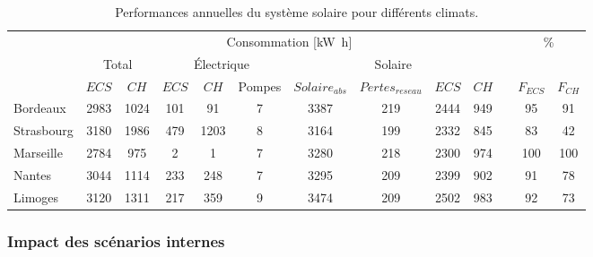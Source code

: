 \begin{table}
\small
\centering
\caption{Performances annuelles du système solaire pour différents climats.}
\label{tab:performance_annuelles}
\begin{tabular}{l c c c c c c c c c c c c}
    \toprule
               &   \multicolumn{9}{c}{Consommation [\si{\kilo\watt\hour}]} & & \multicolumn{2}{c}{\multirow{2}{*}{\%}} \\
    \cmidrule(r){2-10}
               & \multicolumn{2}{c}{Total} &  \multicolumn{3}{c}{Électrique}  & \multicolumn{4}{c}{Solaire} & \\
    \cmidrule(r){2-3}
    \cmidrule(r){4-6}
    \cmidrule(r){7-10}
    \cmidrule(r){12-13}
               & $ECS$    & $CH$      &  $ECS$        & $CH$ & Pompes    & $Solaire_{abs}$ & $Pertes_{reseau}$ & $ECS$  & $CH$ & & $F_{ECS}$  & $F_{CH}$ \\
    \midrule
    Bordeaux   & 2983     & 1024      &  101          & 91          &  7             & 3387                  & 219       & 2444   &  949    &   & 95         & 91  \\
    Strasbourg & 3180     & 1986      &  479          & 1203        &  8             & 3164                  & 199       & 2332   &  845    &   & 83         & 42  \\
    Marseille  & 2784     & 975       &  2            & 1           &  7             & 3280                  & 218       & 2300   &  974    &   & 100        & 100 \\
    Nantes     & 3044     & 1114      &  233          & 248         &  7             & 3295                  & 209       & 2399   &  902    &   & 91         & 78  \\
    Limoges    & 3120     & 1311      &  217          & 359         &  9             & 3474                  & 209       & 2502   &  983    &   & 92         & 73  \\
    \bottomrule
\end{tabular}
\end{table}


\subsubsection{Impact des scénarios internes} %
\label{ssub:impact_des_scenarios_internes}




